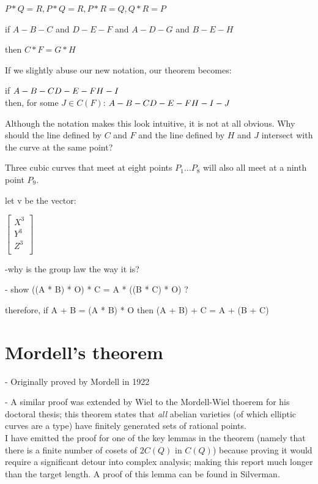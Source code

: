\documentclass{article}
\begin{document}
$P * Q = R, P * Q = R, P * R = Q,  Q * R = P$

if $A - B - C$ and $D - E - F$ and $A - D - G$ and $B - E - H$

then $C * F = G * H$

If we slightly abuse our new notation, our theorem becomes:

if
$
\\
A - B - C \\
D - E - F \\
H - I
$\\
then, for some $J \in C(F)$:
$
\\
A - B - C \\
D - E - F \\
H - I - J
$

Although the notation makes this look intuitive, it is not at all obvious. 
Why should the line defined by $C$ and $F$ and the line defined by $H$ and $J$ intersect with the curve at the same point? 

Three cubic curves that meet at eight points $P_1 \dots P_8$ will also all meet at a ninth point $P_9$.

let v be the vector:

$
\begin{bmatrix}
X^3 \\
Y^3 \\
Z^3 \\
\end{bmatrix} 
$

-why is the group law the way it is?

- show ((A * B) * O) * C = A * ((B * C) * O) ?

therefore, if A + B = (A * B) * O then (A + B) + C = A + (B + C)

\newpage

\section{Mordell's theorem}

- Originally proved by Mordell in 1922

- A similar proof was extended by Wiel to the Mordell-Wiel thoerem for his doctoral thesis; this theorem states that \emph{all} abelian varieties (of which elliptic curves are a type) have finitely generated sets of rational points.\\

I have emitted the proof for one of the key lemmas in the theorem (namely that there is a finite number of cosets of $2C(Q)$ in $C(Q)$) because proving it would require a significant detour into complex analysis; making this report much longer than the target length. A proof of this lemma can be found in Silverman.
\end{document}

